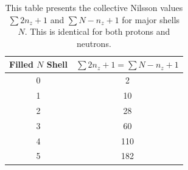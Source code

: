 \documentclass[10pt,a4paper, twoside, openright]{report}
\begin{document}
\begin{table} 
\centering
\caption[Collective Nilsson numbers for major shells.]{This table presents the collective Nilsson values $\sum 2n_z + 1$ and $\sum N - n_z + 1$ for major shells $N$. This is identical for both protons and neutrons. \label{table:FullShellNz}}
\begin{tabular}{c|c}
\toprule
\toprule
Filled $N$ Shell & $\sum 2n_z + 1 = \sum N - n_z + 1$ \\ [2pt]
\midrule
0 & 2\\
1 & 10\\
2 & 28\\
3 & 60\\
4 & 110\\
5 & 182 \\
\bottomrule
\bottomrule
\end{tabular}
\end{table}
\end{document}
